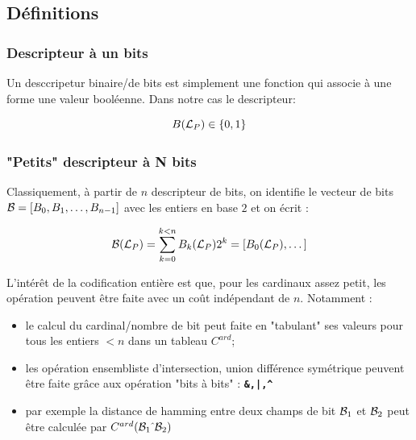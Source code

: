 
\subsection{D\'efinitions}

\subsubsection{Descripteur \`a un bits}
Un desccripetur binaire/de bits est simplement une fonction qui associe \`a une forme une valeur bool\'eenne.
Dans notre cas le descripteur:

\begin{equation}
    B({\mathcal L_P}) \in \{0,1\}
\end{equation}

\subsubsection{"Petits" descripteur \`a N bits}

Classiquement, \`a partir de $n$ descripteur de bits,  on identifie
le vecteur de bits ${\mathcal B} = [B_0, B_1, \dots , B_{n-1}]$ avec les entiers en base $2$
et on \'ecrit   :

\begin{equation}
   {\mathcal B}({\mathcal L_P})  =  \sum_{k=0}^{k<n} B_k({\mathcal L_P}) 2^k  =  [B_0({\mathcal L_P}), \dots ]
\end{equation}

L'int\'er\^et de la codification enti\`ere est que, pour les  cardinaux assez petit, les op\'eration
peuvent \^etre faite avec un co\^ut ind\'ependant de $n$.  Notamment :

\begin{itemize}
   \item le calcul du cardinal/nombre de bit peut faite en "tabulant" ses valeurs pour tous les entiers $<n$
         dans un tableau $C^{ard}$;

   \item les op\'eration ensembliste d'intersection, union diff\'erence sym\'etrique peuvent être faite gr\^ace aux
         op\'eration "bits \`a bits"  : {\tt \bf  \&,|,\^{}}

   \item par exemple la distance de hamming entre deux champs de bit ${\mathcal B}_1$ et ${\mathcal B}_2$  peut \^etre 
         calcul\'ee par $C^{ard}({\mathcal B}_1 \hat{~}  {\mathcal B}_2)$

\end{itemize}

